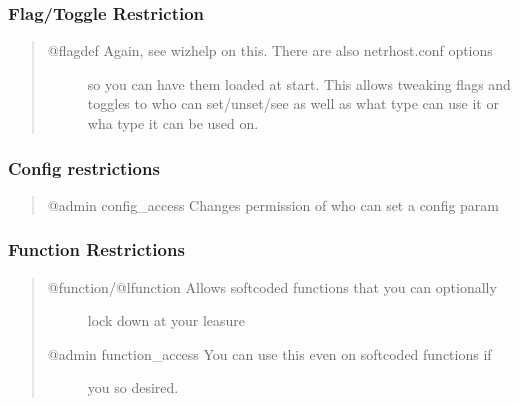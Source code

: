 \documentclass[letterpaper,10pt,english]{sphinxmanual}
\begin{document}
\subsubsection{Flag/Toggle Restriction}
\label{\detokenize{security:flag-toggle-restriction}}\begin{quote}
\begin{description}
\item[{@flagdef \sphinxhyphen{} Again, see wizhelp on this.  There are also netrhost.conf options}] \leavevmode
\sphinxAtStartPar
so you can have them loaded at start.  This allows tweaking flags
and toggles to who can set/unset/see as well as what type can
use it or wha type it can be used on.

\end{description}
\end{quote}


\subsubsection{Config restrictions}
\label{\detokenize{security:config-restrictions}}\begin{quote}

\sphinxAtStartPar
@admin config\_access \sphinxhyphen{} Changes permission of who can set a config param
\end{quote}


\subsubsection{Function Restrictions}
\label{\detokenize{security:function-restrictions}}\begin{quote}
\begin{description}
\item[{@function/@lfunction \textendash{} Allows softcoded functions that you can optionally}] \leavevmode
\sphinxAtStartPar
lock down at your leasure

\item[{@admin function\_access \textendash{} You can use this even on softcoded functions if}] \leavevmode
\sphinxAtStartPar
you so desired.

\end{description}
\end{quote}
\end{document}
